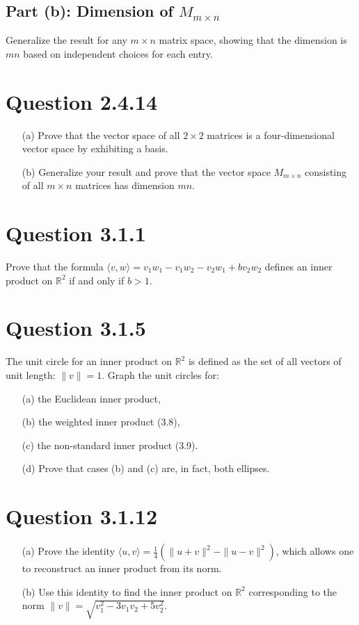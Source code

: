 \documentclass[12pt]{article}
\begin{document}
\subsection*{Part (b): Dimension of \(M_{m \times n}\)}
Generalize the result for any \(m \times n\) matrix space, showing that the dimension is \(mn\) based on independent choices for each entry.


\newpage
\section*{Question 2.4.14}
\begin{itemize}
    \item[(a)] Prove that the vector space of all \(2 \times 2\) matrices is a four-dimensional vector space by exhibiting a basis.
    \item[(b)] Generalize your result and prove that the vector space \(M_{m \times n}\) consisting of all \(m \times n\) matrices has dimension \(mn\).
\end{itemize}

\newpage
\section*{Question 3.1.1}
Prove that the formula \( \langle v, w \rangle = v_1 w_1 - v_1 w_2 - v_2 w_1 + b v_2 w_2 \) defines an inner product on \( \mathbb{R}^2 \) if and only if \( b > 1 \).

\section*{Question 3.1.5}
The unit circle for an inner product on \( \mathbb{R}^2 \) is defined as the set of all vectors of unit length: \( \|v\| = 1 \). Graph the unit circles for:
\begin{itemize}
    \item[(a)] the Euclidean inner product,
    \item[(b)] the weighted inner product (3.8),
    \item[(c)] the non-standard inner product (3.9).
    \item[(d)] Prove that cases (b) and (c) are, in fact, both ellipses.
\end{itemize}

\section*{Question 3.1.12}
\begin{itemize}
    \item[(a)] Prove the identity \( \langle u, v \rangle = \frac{1}{4} (\|u + v\|^2 - \|u - v\|^2) \), which allows one to reconstruct an inner product from its norm.
    \item[(b)] Use this identity to find the inner product on \( \mathbb{R}^2 \) corresponding to the norm \( \|v\| = \sqrt{v_1^2 - 3v_1 v_2 + 5v_2^2} \).
\end{itemize}
\end{document}
